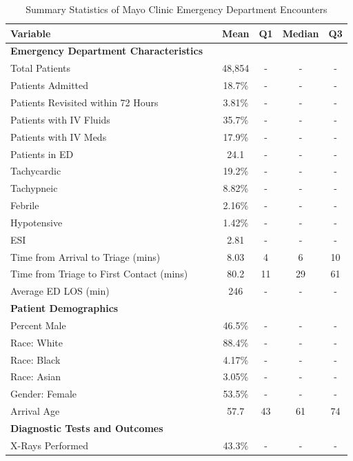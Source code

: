 \documentclass{article}
\begin{document}
\begin{table}[ht]
\centering
\caption{Summary Statistics of Mayo Clinic Emergency Department Encounters}
\label{tab:summary_stats}
\begin{threeparttable}
\begin{tabular}{p{10cm}ccccc}
\toprule
Variable &  & {Mean} & {Q1} & {Median} & {Q3} \\
\midrule
\textbf{Emergency Department Characteristics} & & & & & \\
Total Patients & & {48,854} & {-} & {-} & {-} \\
Patients Admitted & & {18.7\%} & {-} & {-} & {-} \\
Patients Revisited within 72 Hours & & {3.81\%} & {-} & {-} & {-} \\
Patients with IV Fluids & & {35.7\%} & {-} & {-} & {-} \\
Patients with IV Meds & & {17.9\%} & {-} & {-} & {-} \\
Patients in ED & & {24.1} & {-} & {-} & {-} \\
Tachycardic & & {19.2\%} & {-} & {-} & {-} \\
Tachypneic & & {8.82\%} & {-} & {-} & {-} \\
Febrile & & {2.16\%} & {-} & {-} & {-} \\
Hypotensive & & {1.42\%} & {-} & {-} & {-} \\
ESI & & {2.81} & {-} & {-} & {-} \\
Time from Arrival to Triage (mins) & & {8.03} & {4} & {6} & {10} \\
Time from Triage to First Contact (mins) & & {80.2} & {11} & {29} & {61} \\
Average ED LOS (min) & & {246} & {-} & {-} & {-} \\
\midrule
\textbf{Patient Demographics} & & & & & \\
Percent Male & & {46.5\%} & {-} & {-} & {-} \\
Race: White & & {88.4\%} & {-} & {-} & {-} \\
Race: Black & & {4.17\%} & {-} & {-} & {-} \\
Race: Asian & & {3.05\%} & {-} & {-} & {-} \\
Gender: Female & & {53.5\%} & {-} & {-} & {-} \\
Arrival Age & & {57.7} & {43} & {61} & {74} \\
\midrule
\textbf{Diagnostic Tests and Outcomes} & & & & & \\
X-Rays Performed & & {43.3\%} & {-} & {-} & {-} \\

\end{tabular}
\end{threeparttable}
\end{table}
\end{document}
